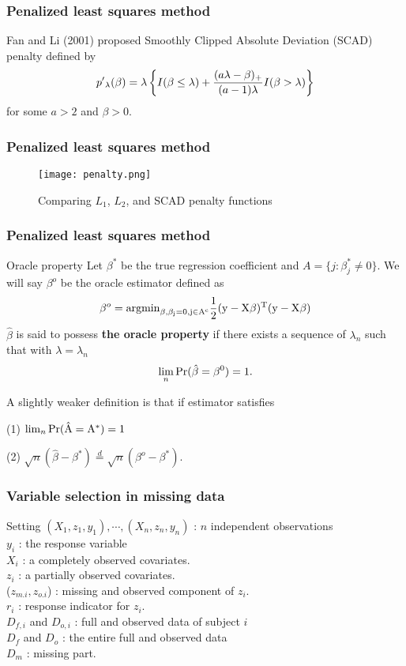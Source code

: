 \documentclass{beamer}
\begin{document}
\begin{frame}
\frametitle{Penalized least squares method}
 Fan and Li (2001) proposed Smoothly Clipped Absolute Deviation (SCAD) penalty defined by
$$
p\rq{} _\lambda ( \beta ) =\lambda \left\{ I(\beta \leq \lambda) + \frac{(a \lambda - \beta)_{+}}{(a-1) \lambda} I(\beta > \lambda) \right\} 
$$
for some $a>2$ and $\beta>0$.

\end{frame}
\begin{frame}
\frametitle{Penalized least squares method}
\begin{figure}[h]
\centering
\texttt{[image: penalty.png]}
\caption{Comparing $L_1$, $L_2$, and SCAD penalty functions}
\end{figure}
\end{frame}
\begin{frame}
\frametitle{Penalized least squares method}
\begin{block}{Oracle property}
 Let $\beta^*$ be the true regression coefficient and $A= \{ j : \beta^* _j  \neq 0 \} $. We will say $\beta^o$ be the oracle estimator defined as
$$
\beta^o = \rm{argmin}_{\beta , \beta_j = 0, j \in A^c} \frac{1}{2} (y - X \beta)^T (y - X \beta)
$$
 $\hat{\beta}$ is said to possess \textbf{the oracle property} if there exists a sequence of $\lambda_n$ such that with $\lambda = \lambda_n$  $$ \lim_n \rm{Pr}( \hat{\beta}  = \beta^0 ) =1 .$$

A slightly weaker definition is that if estimator satisfies 

(1)	$ \lim_n \rm{Pr}( \hat{A }  = A^* ) =1 $

(2)	$ \sqrt{n} ( \hat{\beta} - \beta^*  ) \overset{d}= \sqrt{n} ( \beta^o - \beta^*  ) . $
\end{block}
\end{frame}
\begin{frame}
\frametitle{Variable selection in missing data}
\begin{block}{Setting}
$(X_1, z_1, y_1), \cdots, (X_n, z_n, y_n)$ : $n$ independent observations\\
$y_i$ : the response variable\\
$X_i$ : a completely observed covariates.\\
$z_i$ : a partially observed covariates.\\
 ($z_{m.i}, z_{o.i}$) : missing and observed component of $z_i$.\\
$r_i$ : response indicator for $z_i$.\\
$D_{f,i}$ and $D_{o,i}$ : full and observed data of subject $i$\\
$D_{f}$ and $D_{o}$ :  the entire full and observed data \\
$D_{m}$ : missing part.
\end{block}
\end{frame}
\end{document}
